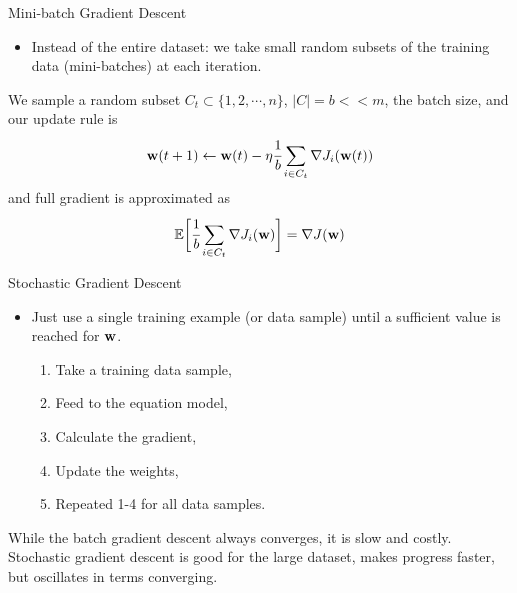\documentclass[aspectratio=169,xcolor=dvipsnames,svgnames,x11names,fleqn]{beamer}
\begin{document}
\begin{frame}{Mini-batch Gradient Descent}

\begin{itemize}
    \item Instead of the entire dataset: we take small random subsets of the training data (mini-batches) at each iteration.
\end{itemize}
We sample a random subset $C_t \subset \{1, 2, \cdots, n\}$, $|C| = b << m$, the batch size, and our update rule is
\begin{equation}
    {\mathbf w}(t+1) \leftarrow {\mathbf w}(t) -\eta \cfrac{1}{b}\sum_{i \in C_t}\nabla J_i({\mathbf w}(t))
\end{equation}
and full gradient is approximated as
\begin{equation}
    {\mathbb E}\bigg[ \cfrac{1}{b} \sum_{i \in C_t}\nabla J_i({\mathbf w})\bigg] = \nabla J({\mathbf w})
\end{equation}
\end{frame}
\begin{frame}{Stochastic Gradient Descent}

\begin{itemize}
    \item Just use a single training example (or data sample) until a sufficient value is reached for ${\mathbf w}$.
    \begin{enumerate}
        \item Take a training data sample, 
        \item Feed to the equation model,
        \item Calculate the gradient,
        \item Update the weights,
        \item Repeated 1-4 for all data samples.
    \end{enumerate}
\end{itemize}

\begin{talert}{}
While the batch gradient descent always converges, it is slow and costly. Stochastic gradient descent is good for the large dataset, makes progress faster, but oscillates in terms converging.
\end{talert}
\end{frame}
\end{document}
